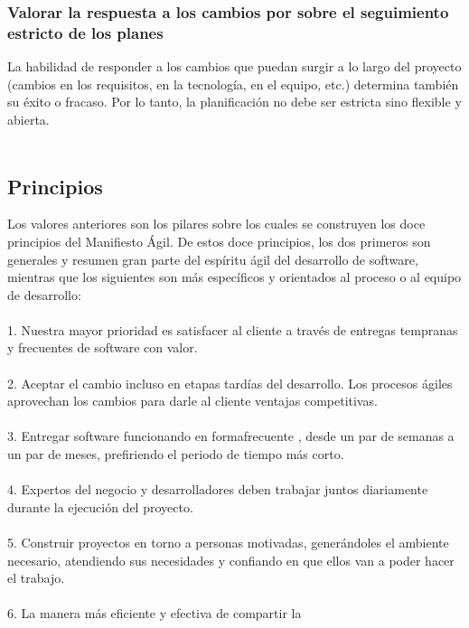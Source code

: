 \subsubsection{Valorar la respuesta a los cambios por sobre el seguimiento 
	estricto de los planes }
La habilidad de responder a los cambios que puedan surgir a lo 
largo del proyecto (cambios en los requisitos, en la tecnología, 
en el equipo, etc.) determina también su éxito o fracaso. Por lo 
tanto, la planificación no debe ser estricta sino flexible y abierta. 
\\
\\
\subsection{Principios}
Los     valores    anteriores    son    los  pilares    sobre    los  cuales    se 
construyen   los   doce   principios   del   Manifiesto   Ágil.   De   estos 
doce principios, los dos primeros son generales y resumen gran 
parte   del   espíritu   ágil   del   desarrollo   de   software,   mientras   que 
los siguientes son más específicos y orientados al proceso o al 
equipo de desarrollo:\\
\\
1.  Nuestra mayor prioridad es satisfacer al cliente a través 
de   entregas     tempranas      y  frecuentes     de   software    con 
valor. 
\\
\\
2.  Aceptar       el   cambio      incluso     en   etapas     tardías    del 
desarrollo.   Los   procesos   ágiles   aprovechan   los   cambios 
para darle al cliente ventajas competitivas.\\
\\
3.   Entregar software funcionando en formafrecuente , desde 
un   par   de   semanas   a   un   par   de   meses,   prefiriendo   el 
periodo de tiempo más corto. \\
\\
4.   Expertos     del   negocio    y  desarrolladores      deben    trabajar 
juntos diariamente durante la ejecución del proyecto. \\
\\
5.   Construir      proyectos     en   torno    a  personas     motivadas, 
generándoles       el   ambiente      necesario,     atendiendo      sus 
necesidades y confiando en que ellos van a poder hacer 
el trabajo.\\
\\
6.   La    manera     más    eficiente   y   efectiva    de  compartir      la 
